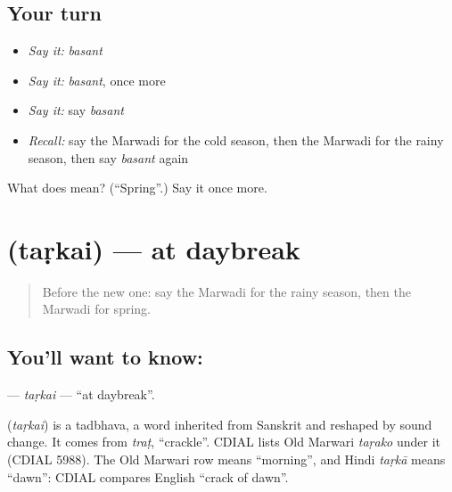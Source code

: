 \subsection*{Your turn}
\begin{itemize}
\raggedright
  \item \emph{Say it:} \emph{basant}
  \item \emph{Say it:} \emph{basant}, once more
  \item \emph{Say it:} say \emph{basant}
  \item \emph{Recall:} say the Marwadi for the cold season, then the Marwadi for the rainy season, then say \emph{basant} again
\end{itemize}

\begin{tcolorbox}[breakable,colback=teal!4,colframe=teal!35!black,title={Before you move on}]
What does  mean? (\textquotedblleft{}Spring\textquotedblright{}.) Say it once more.
\end{tcolorbox}
\section[\texorpdfstring{\mw{तड़कै} (taṛkai)}{तड़कै (taṛkai)}]{ (taṛkai) — at daybreak}

\label{lesson:MW-C95-tarkai}



\begin{quote}
Before the new one: say the Marwadi for the rainy season, then the Marwadi for spring.
\end{quote}

\subsection*{You'll want to know: }
\textbf{} — \emph{taṛkai} — \textquotedblleft{}at daybreak\textquotedblright{}.

\begin{cousinweb}
\textbf{} (\emph{taṛkai}) is a tadbhava, a word inherited from Sanskrit and reshaped by sound change. It comes from \emph{traṭ}, \textquotedblleft{}crackle\textquotedblright{}. CDIAL lists Old Marwari \emph{taṛako} under it (CDIAL 5988). The Old Marwari row means \textquotedblleft{}morning\textquotedblright{}, and Hindi \emph{taṛkā} means \textquotedblleft{}dawn\textquotedblright{}: CDIAL compares English \textquotedblleft{}crack of dawn\textquotedblright{}.
\end{cousinweb}


